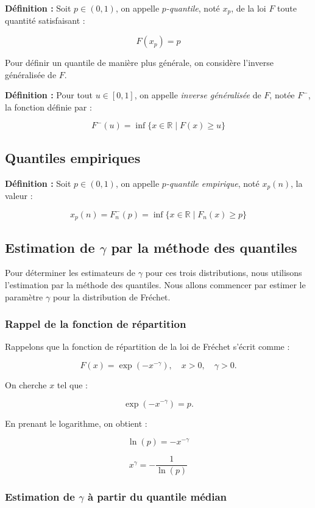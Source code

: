 \documentclass{article}
\begin{document}
\textbf{Définition :} Soit \(p \in (0,1)\), on appelle \textit{\(p\)-quantile}, noté \(x_p\), de la loi \(F\) toute quantité satisfaisant :

\[
F(x_p) = p
\]

Pour définir un quantile de manière plus générale, on considère l'inverse généralisée de \(F\).

\textbf{Définition :} Pour tout \(u \in [0,1]\), on appelle \textit{inverse généralisée} de \(F\), notée \(F^-\), la fonction définie par :

\[
F^-(u) = \inf \{ x \in \mathbb{R} \mid F(x) \geq u \}
\]

\subsection{Quantiles empiriques}

\textbf{Définition :} Soit \(p \in (0,1)\), on appelle \textit{\(p\)-quantile empirique}, noté \(x_p(n)\), la valeur :

\[
x_p(n) = F_n^-(p) = \inf \{ x \in \mathbb{R} \mid F_n(x) \geq p \}
\]

\subsection{Estimation de \(\gamma\) par la méthode des quantiles}

Pour déterminer les estimateurs de \(\gamma\) pour ces trois distributions, nous utilisons l'estimation par la méthode des quantiles.  
Nous allons commencer par estimer le paramètre \(\gamma\) pour la distribution de Fréchet.

\subsubsection{Rappel de la fonction de répartition}

Rappelons que la fonction de répartition de la loi de Fréchet s'écrit comme :

\[
F(x) = \exp(-x^{-\gamma}), \quad x > 0, \quad \gamma > 0.
\]

On cherche \(x\) tel que :

\[
\exp(-x^{-\gamma}) = p.
\]

En prenant le logarithme, on obtient :

\[
\ln(p) = -x^{-\gamma}
\]

\[
x^{\gamma} = -\frac{1}{\ln(p)}
\]

\subsubsection{Estimation de \(\gamma\) à partir du quantile médian}
\end{document}
